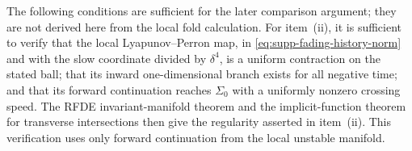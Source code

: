 \begin{remark}
The following conditions are sufficient for the later comparison argument;
they are not derived here from the local fold calculation.  For
item~\textup{(ii)}, it is sufficient to verify that the local
Lyapunov--Perron map, in \cref{eq:supp-fading-history-norm} and with the slow
coordinate divided by \(\delta^4\), is a uniform contraction on the stated
ball; that its inward one-dimensional branch exists for all negative time;
and that its forward continuation reaches \(\Sigma_0\) with a uniformly
nonzero crossing speed.  The RFDE invariant-manifold theorem and the
implicit-function theorem for transverse intersections then give the regularity asserted in
item~\textup{(ii)}.  This verification uses only forward continuation from
the local unstable manifold.


\end{remark}
